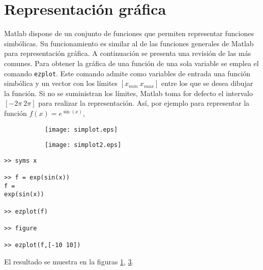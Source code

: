 \section{Representación gráfica}
Matlab dispone de un conjunto de funciones que permiten representar funciones simbólicas. Su funcionamiento es similar al de las funciones generales de Matlab para representación gráfica. A continuación se presenta una revisión de las más comunes.
Para obtener la gráfica de una función de una sola variable se emplea el comando \texttt{ezplot}. Este comando admite como variables de entrada una función simbólica y un vector con los límites $[x_{min}\ x_{max}]$ entre los que se desea dibujar la función. Si no se suministran los límites, Matlab toma for defecto el intervalo $[-2\pi \ 2\pi]$ para realizar la representación. Así, por ejemplo para representar la función $f(x) = e^{\sin(x)}$,

\begin{figure}
	\centering
	\begin{subfigure}{0.45\textwidth}
		\texttt{[image: simplot.eps]}
		 \label{fig:simplot1}
	\end{subfigure} 
	\begin{subfigure}{0.45\textwidth}
		\texttt{[image: simplot2.eps]}
		 \label{fig:simplot2}
	\end{subfigure}
\end{figure}
\begin{verbatim}
>> syms x

>> f = exp(sin(x)) 
f = 
exp(sin(x))
  
>> ezplot(f)

>> figure

>> ezplot(f,[-10 10])
\end{verbatim}
El resultado se muestra en la figuras \ref{fig:simplot1}, \ref{fig:simplot2}. 

